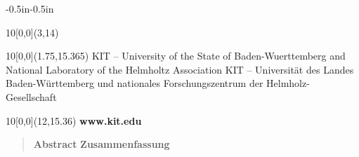 \begin{titlepage}
\begin{adjustwidth}{-0.5in}{-0.5in}
\begin{textblock}{10}[0,0](3,14)
\begin{center}
\large{\term}
\end{center}
\end{textblock}

\begin{textblock}{10}[0,0](1.75,15.365)
\tiny{
        {KIT -- University of the State of Baden-Wuerttemberg and National Laboratory of the Helmholtz Association}
        {KIT -- Universität des Landes Baden-Württemberg und nationales Forschungszentrum der Helmholz-Gesellschaft}
}
\end{textblock}

\begin{textblock}{10}[0,0](12,15.36)
\large{
    \textbf{www.kit.edu}
}
\end{textblock}
\end{adjustwidth}
\end{titlepage}




\hfill
\thispagestyle{empty}
\newpage

\pagestyle{scrheadings}
\ohead{\pagemark}
\chead{}
\ihead{\mytitle}
\ifoot{\myname}
\cfoot{}

\setcounter{page}{1}

\newpage
\thispagestyle{scrheadings}
\begin{abstract}\hfill \newline
{}
        {\textbf{Abstract}}
        {\textbf{Zusammenfassung}} \\
\myabstract
\end{abstract}

\newpage